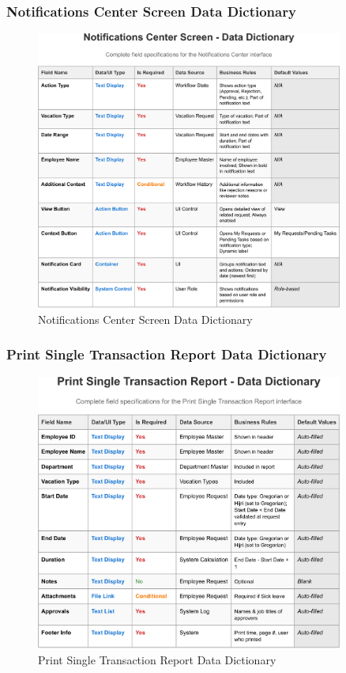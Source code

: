 \documentclass[12pt,a4paper]{article}
\begin{document}
\subsubsection{Notifications Center Screen Data Dictionary}
\begin{figure}[H]
\centering
\includegraphics[width=0.9\textwidth]{Data-Dictionary/Screen-Data-Dictionaries/Notifications-Center-Screen-Data-Dictionary/Notifications-Center-Screen-Data-Dictionary-1.png}
\caption{Notifications Center Screen Data Dictionary}
\label{fig:notifications-center-data-dict}
\end{figure}

\subsubsection{Print Single Transaction Report Data Dictionary}
\begin{figure}[H]
\centering
\includegraphics[width=0.9\textwidth]{Data-Dictionary/Screen-Data-Dictionaries/Print-Single-Transaction-Report-Data-Dictionary/Print-Single-Transaction-Report-Data-Dictionary-1.png}
\caption{Print Single Transaction Report Data Dictionary}
\label{fig:print-single-transaction-data-dict}
\end{figure}
\end{document}
